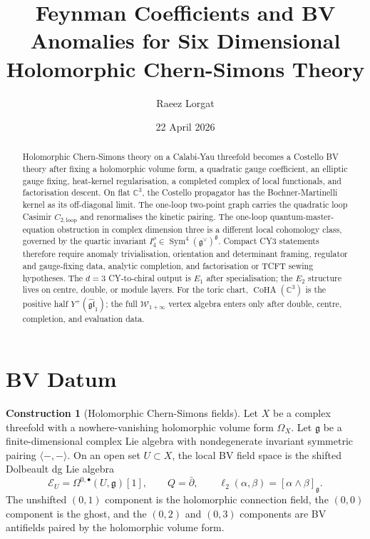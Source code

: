 \documentclass[11pt]{article}
\title{Feynman Coefficients and BV Anomalies for Six Dimensional
Holomorphic Chern-Simons Theory}
\author{Raeez Lorgat}
\date{22 April 2026}
\theoremstyle{definition}
\newtheorem{construction}[theorem]{Construction}
\theoremstyle{remark}
\providecommand{\C}{\mathbb{C}}
\providecommand{\dbar}{\bar{\partial}}
\providecommand{\fg}{\mathfrak{g}}
\providecommand{\fgl}{\mathfrak{gl}}
\providecommand{\Sym}{\operatorname{Sym}}
\providecommand{\CoHA}{\operatorname{CoHA}}
\providecommand{\cE}{\mathcal{E}}
\providecommand{\Yp}{Y^{+}}
\providecommand{\Winf}{\mathcal{W}_{1+\infty}}
\providecommand{\Eone}{E_1}
\providecommand{\Etwo}{E_2}
\providecommand{\Ctwo}{C_{2,\mathrm{loop}}}
\begin{document}
\maketitle

\begin{abstract}
Holomorphic Chern-Simons theory on a Calabi-Yau threefold becomes a
Costello BV theory after fixing a holomorphic volume form, a quadratic
gauge coefficient, an elliptic gauge fixing, heat-kernel regularisation,
a completed complex of local functionals, and factorisation descent.
On flat $\C^3$, the Costello propagator has the Bochner-Martinelli
kernel as its off-diagonal limit.  The one-loop two-point graph carries
the quadratic loop Casimir $\Ctwo$ and renormalises the kinetic pairing.
The one-loop quantum-master-equation obstruction in complex dimension
three is a different local cohomology class, governed by the quartic
invariant $I_4^\rho\in\Sym^4(\fg^\vee)^\fg$.  Compact CY3 statements
therefore require anomaly trivialisation, orientation and determinant
framing, regulator and gauge-fixing data, analytic completion, and
factorisation or TCFT sewing hypotheses.  The $d=3$ CY-to-chiral output
is $\Eone$ after specialisation; the $\Etwo$ structure lives on centre,
double, or module layers.  For the toric chart, $\CoHA(\C^3)$ is the
positive half $\Yp(\widehat{\fgl}_1)$; the full $\Winf$ vertex algebra
enters only after double, centre, completion, and evaluation data.
\end{abstract}

\tableofcontents

\section{BV Datum}
\label{sec:bv-datum}

\begin{construction}[Holomorphic Chern-Simons fields]
\label{cons:hcs-fields}
Let $X$ be a complex threefold with a nowhere-vanishing holomorphic
volume form $\Omega_X$.  Let $\fg$ be a finite-dimensional complex Lie
algebra with nondegenerate invariant symmetric pairing
$\langle-,-\rangle$.  On an open set $U\subset X$, the local BV field
space is the shifted Dolbeault dg Lie algebra
\[
  \cE_U=\Omega^{0,\bullet}(U,\fg)[1],
  \qquad
  Q=\dbar,
  \qquad
  \ell_2(\alpha,\beta)=[\alpha\wedge\beta]_{\fg}.
\]
The unshifted $(0,1)$ component is the holomorphic connection field,
the $(0,0)$ component is the ghost, and the $(0,2)$ and $(0,3)$
components are BV antifields paired by the holomorphic volume form.
\end{construction}
\end{document}
